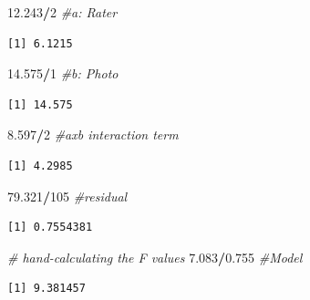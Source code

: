 \documentclass[
  11pt,
]{book}
\newenvironment{Shaded}{\begin{snugshade}}{\end{snugshade}}
\newcommand{\CommentTok}[1]{\textcolor[rgb]{0.37,0.37,0.37}{\textit{#1}}}
\newcommand{\DecValTok}[1]{\textcolor[rgb]{0.06,0.06,0.06}{#1}}
\newcommand{\FloatTok}[1]{\textcolor[rgb]{0.06,0.06,0.06}{#1}}
\newcommand{\SpecialCharTok}[1]{\textcolor[rgb]{0.43,0.43,0.43}{\textbf{#1}}}
\begin{document}
\begin{Shaded}
\begin{Highlighting}[]
\FloatTok{12.243}\SpecialCharTok{/}\DecValTok{2}  \CommentTok{\#a: Rater}
\end{Highlighting}
\end{Shaded}

\begin{verbatim}
[1] 6.1215
\end{verbatim}

\begin{Shaded}
\begin{Highlighting}[]
\FloatTok{14.575}\SpecialCharTok{/}\DecValTok{1}  \CommentTok{\#b:  Photo}
\end{Highlighting}
\end{Shaded}

\begin{verbatim}
[1] 14.575
\end{verbatim}

\begin{Shaded}
\begin{Highlighting}[]
\FloatTok{8.597}\SpecialCharTok{/}\DecValTok{2}  \CommentTok{\#axb interaction term}
\end{Highlighting}
\end{Shaded}

\begin{verbatim}
[1] 4.2985
\end{verbatim}

\begin{Shaded}
\begin{Highlighting}[]
\FloatTok{79.321}\SpecialCharTok{/}\DecValTok{105}  \CommentTok{\#residual}
\end{Highlighting}
\end{Shaded}

\begin{verbatim}
[1] 0.7554381
\end{verbatim}

\begin{Shaded}
\begin{Highlighting}[]
\CommentTok{\# hand{-}calculating the F values}
\FloatTok{7.083}\SpecialCharTok{/}\FloatTok{0.755}  \CommentTok{\#Model}
\end{Highlighting}
\end{Shaded}

\begin{verbatim}
[1] 9.381457
\end{verbatim}
\end{document}
